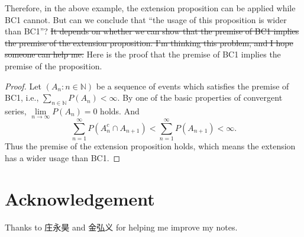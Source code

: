 \documentclass[a4paper, linespread=1.5]{article}
\newcommand{\Natural}{\mathbb{N}}
\begin{document}
    Therefore, in the above example, the extension proposition can be applied while BC1 cannot. But can we conclude that ``the usage of this proposition is wider than BC1''? \sout{It depends on whether we can show that the premise of BC1 implies the premise of the extension proposition. I'm thinking this problem, and I hope someone can help me.} Here is the proof that the premise of BC1 implies the premise of the proposition.
    \begin{proof}
        Let $(A_n \colon n \in \Natural)$ be a sequence of events which satisfies the premise of BC1, i.e., $\sum_{n \in \Natural} P(A_n) < \infty$. By one of the basic properties of convergent series, $\lim\limits_{n \rightarrow \infty} P(A_n) = 0$ holds. And
        $$
        \sum_{n = 1}^{\infty} P(A_n^c \cap A_{n + 1}) < \sum_{n = 1}^{\infty} P(A_{n + 1}) < \infty.
        $$
        Thus the premise of the extension proposition holds, which means the extension has a wider usage than BC1.
    \end{proof}

    \section*{Acknowledgement}
    Thanks to 庄永昊 and 金弘义 for helping me improve my notes.
    
    
    
\end{document}

